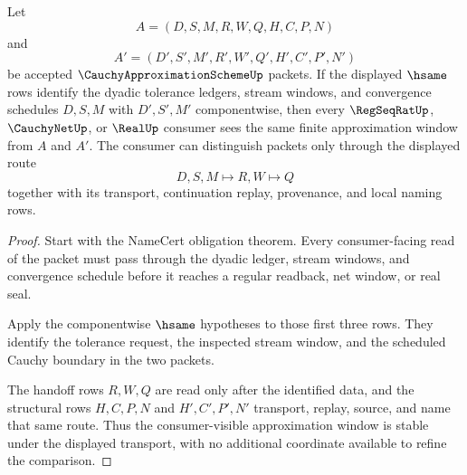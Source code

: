 \begin{theorem}
\label{thm:cauchy-approximation-scheme-window-stability}
Let
$$
A=(D,S,M,R,W,Q,H,C,P,N)
$$
and
$$
A'=(D',S',M',R',W',Q',H',C',P',N')
$$
be accepted $\CauchyApproximationSchemeUp$ packets. If the displayed $\hsame$ rows identify the dyadic tolerance ledgers, stream windows, and convergence schedules $D,S,M$ with $D',S',M'$ componentwise, then every $\RegSeqRatUp$, $\CauchyNetUp$, or $\RealUp$ consumer sees the same finite approximation window from $A$ and $A'$. The consumer can distinguish packets only through the displayed route
$$
D,S,M \longmapsto R,W \longmapsto Q
$$
together with its transport, continuation replay, provenance, and local naming rows.
\end{theorem}

\begin{proof}
Start with the NameCert obligation theorem. Every consumer-facing read of the packet must pass through the dyadic ledger, stream windows, and convergence schedule before it reaches a regular readback, net window, or real seal.

Apply the componentwise $\hsame$ hypotheses to those first three rows. They identify the tolerance request, the inspected stream window, and the scheduled Cauchy boundary in the two packets.

The handoff rows $R,W,Q$ are read only after the identified data, and the structural rows $H,C,P,N$ and $H',C',P',N'$ transport, replay, source, and name that same route. Thus the consumer-visible approximation window is stable under the displayed transport, with no additional coordinate available to refine the comparison.
\end{proof}


\begin{closurestatus}{\CauchyApproximationSchemeUp}
  \theoryclosure{\seedClosure}
  \formalstatus{\unformalizedV}
\end{closurestatus}
